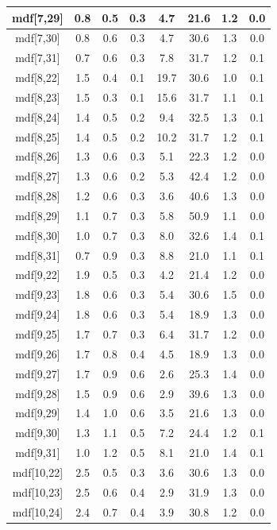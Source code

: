 \begin{longtable}{|c|c|c|c|c|c|c|c|}
\hline
mdf[7,29] & 0.8 & 0.5 & 0.3 & 4.7 & 21.6 & 1.2 & 0.0 \\
\hline
mdf[7,30] & 0.8 & 0.6 & 0.3 & 4.7 & 30.6 & 1.3 & 0.0 \\
\hline
mdf[7,31] & 0.7 & 0.6 & 0.3 & 7.8 & 31.7 & 1.2 & 0.1 \\
\hline
mdf[8,22] & 1.5 & 0.4 & 0.1 & 19.7 & 30.6 & 1.0 & 0.1 \\
\hline
mdf[8,23] & 1.5 & 0.3 & 0.1 & 15.6 & 31.7 & 1.1 & 0.1 \\
\hline
mdf[8,24] & 1.4 & 0.5 & 0.2 & 9.4 & 32.5 & 1.3 & 0.1 \\
\hline
mdf[8,25] & 1.4 & 0.5 & 0.2 & 10.2 & 31.7 & 1.2 & 0.1 \\
\hline
mdf[8,26] & 1.3 & 0.6 & 0.3 & 5.1 & 22.3 & 1.2 & 0.0 \\
\hline
mdf[8,27] & 1.3 & 0.6 & 0.2 & 5.3 & 42.4 & 1.2 & 0.0 \\
\hline
mdf[8,28] & 1.2 & 0.6 & 0.3 & 3.6 & 40.6 & 1.3 & 0.0 \\
\hline
mdf[8,29] & 1.1 & 0.7 & 0.3 & 5.8 & 50.9 & 1.1 & 0.0 \\
\hline
mdf[8,30] & 1.0 & 0.7 & 0.3 & 8.0 & 32.6 & 1.4 & 0.1 \\
\hline
mdf[8,31] & 0.7 & 0.9 & 0.3 & 8.8 & 21.0 & 1.1 & 0.1 \\
\hline
mdf[9,22] & 1.9 & 0.5 & 0.3 & 4.2 & 21.4 & 1.2 & 0.0 \\
\hline
mdf[9,23] & 1.8 & 0.6 & 0.3 & 5.4 & 30.6 & 1.5 & 0.0 \\
\hline
mdf[9,24] & 1.8 & 0.6 & 0.3 & 5.4 & 18.9 & 1.3 & 0.0 \\
\hline
mdf[9,25] & 1.7 & 0.7 & 0.3 & 6.4 & 31.7 & 1.2 & 0.0 \\
\hline
mdf[9,26] & 1.7 & 0.8 & 0.4 & 4.5 & 18.9 & 1.3 & 0.0 \\
\hline
mdf[9,27] & 1.7 & 0.9 & 0.6 & 2.6 & 25.3 & 1.4 & 0.0 \\
\hline
mdf[9,28] & 1.5 & 0.9 & 0.6 & 2.9 & 39.6 & 1.3 & 0.0 \\
\hline
mdf[9,29] & 1.4 & 1.0 & 0.6 & 3.5 & 21.6 & 1.3 & 0.0 \\
\hline
mdf[9,30] & 1.3 & 1.1 & 0.5 & 7.2 & 24.4 & 1.2 & 0.1 \\
\hline
mdf[9,31] & 1.0 & 1.2 & 0.5 & 8.1 & 21.0 & 1.4 & 0.1 \\
\hline
mdf[10,22] & 2.5 & 0.5 & 0.3 & 3.6 & 30.6 & 1.3 & 0.0 \\
\hline
mdf[10,23] & 2.5 & 0.6 & 0.4 & 2.9 & 31.9 & 1.3 & 0.0 \\
\hline
mdf[10,24] & 2.4 & 0.7 & 0.4 & 3.9 & 30.8 & 1.2 & 0.0 \\

\end{longtable}

